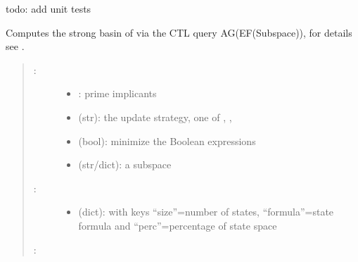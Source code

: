 \documentclass[letterpaper,10pt,english]{sphinxmanual}
\begin{document}
\begin{fulllineitems}
\label{\detokenize{Basins:PyBoolNet.Basins.strong_basin}}
todo: add unit tests

Computes the strong basin of  via the CTL query AG(EF(Subspace)), for details see {\hyperref[\detokenize{Bibliography:klarner2018}]{}}.
\begin{quote}
\begin{description}
\item[{:}] \leavevmode\begin{itemize}
\item {} 
: prime implicants

\item {} 
 (str):  the update strategy, one of , , 

\item {} 
 (bool): minimize the Boolean expressions

\item {} 
 (str/dict): a subspace

\end{itemize}

\item[{:}] \leavevmode\begin{itemize}
\item {} 
 (dict): with keys “size”=number of states, “formula”=state formula and “perc”=percentage of state space

\end{itemize}

\end{description}

:

\begin{sphinxVerbatim}[commandchars=\\\{\}]
   
\end{sphinxVerbatim}
\end{quote}

\end{fulllineitems}
\end{document}
